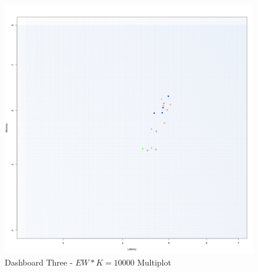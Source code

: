 \begin{figure}[h!tbp]
	\centering
	\includegraphics[width=0.90\linewidth]{images/dashboard-3}	
	\caption[\textsc{Analyser} Investigation Stack - Level 0 - Dashboard Three - Multiplot Version]{Dashboard Three - $EW*K=10000$ Multiplot} 
	\label{fig:result_dashboard_probb}
\end{figure}

